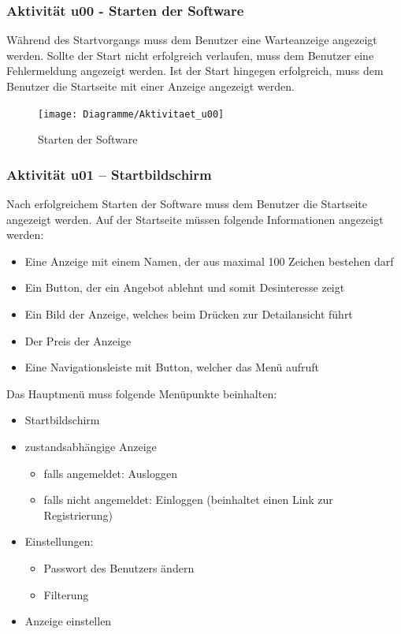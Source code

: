\documentclass[a4paper,12pt,oneside]{scrartcl}
\begin{document}
\subsubsection{Aktivität u00 - Starten der Software}
Während des Startvorgangs muss dem Benutzer eine Warteanzeige angezeigt werden.
Sollte der Start nicht erfolgreich verlaufen, muss dem Benutzer eine Fehlermeldung angezeigt werden.
Ist der Start hingegen erfolgreich, muss dem Benutzer die Startseite mit einer Anzeige angezeigt werden.

\begin{figure}[!htbp]
\centering
\noindent\texttt{[image: Diagramme/Aktivitaet\_u00]}
\caption{Starten der Software}
\end{figure}
\FloatBarrier


\hypertarget{u01}{\subsubsection{Aktivität u01 – Startbildschirm}}
Nach erfolgreichem Starten der Software muss dem Benutzer die Startseite angezeigt werden. 
Auf der Startseite müssen folgende Informationen angezeigt werden:
\begin{itemize}
	\item Eine Anzeige mit einem Namen, der aus maximal 100 Zeichen bestehen darf
	\item Ein Button, der ein Angebot ablehnt und somit Desinteresse zeigt
	\item Ein Bild der Anzeige, welches beim Drücken zur Detailansicht führt
	\item Der Preis der Anzeige
	\item Eine Navigationsleiste mit Button, welcher das Menü aufruft
\end{itemize}
Das Hauptmenü muss folgende Menüpunkte beinhalten:
\begin{itemize}
	\item Startbildschirm
	\item zustandsabhängige Anzeige
	\begin{itemize}
		\item falls angemeldet: Ausloggen 
		\item falls nicht angemeldet: Einloggen (beinhaltet einen Link zur Registrierung)
	\end{itemize}
	\item Einstellungen:
	\begin{itemize}
		\item Passwort des Benutzers ändern
		\item Filterung
	\end{itemize}
	\item Anzeige einstellen
\end{itemize}
\end{document}
